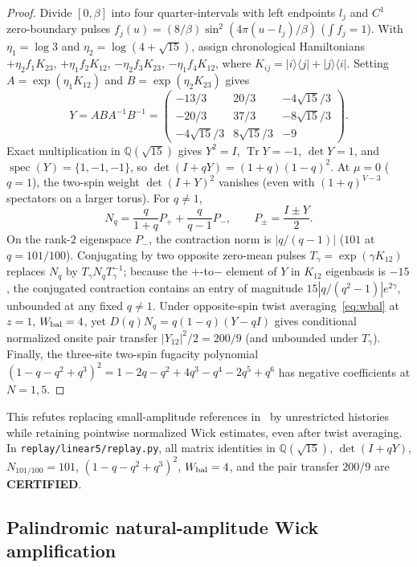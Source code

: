\documentclass[11pt]{article}
\theoremstyle{remark}
\DeclareMathOperator{\Tr}{Tr}
\DeclareMathOperator{\spec}{spec}
\newcommand{\certified}{\textbf{CERTIFIED}}
\begin{document}
\begin{proof}
Divide $[0,\beta]$ into four quarter-intervals with left endpoints $l_j$ and $C^1$ zero-boundary pulses $f_j(u)=(8/\beta)\sin^2(4\pi(u-l_j)/\beta)$ ($\int f_j=1$). With $\eta_1=\log 3$ and $\eta_2=\log(4+\sqrt{15})$, assign chronological Hamiltonians $+\eta_2 f_1 K_{23}$, $+\eta_1 f_2 K_{12}$, $-\eta_2 f_3 K_{23}$, $-\eta_1 f_4 K_{12}$, where $K_{ij}=|i\rangle\langle j|+|j\rangle\langle i|$. Setting $A=\exp(\eta_1 K_{12})$ and $B=\exp(\eta_2 K_{23})$ gives
\begin{equation}\label{eq:monodromy-Y}
 Y=ABA^{-1}B^{-1}=
 \begin{pmatrix}
  -13/3 & 20/3 & -4\sqrt{15}/3\\
  -20/3 & 37/3 & -8\sqrt{15}/3\\
  -4\sqrt{15}/3 & 8\sqrt{15}/3 & -9
 \end{pmatrix}.
\end{equation}
Exact multiplication in $\mathbb Q(\sqrt{15})$ gives $Y^2=I$, $\Tr Y=-1$, $\det Y=1$, and $\spec(Y)=\{1,-1,-1\}$, so $\det(I+qY)=(1+q)(1-q)^2$. At $\mu=0$ ($q=1$), the two-spin weight $\det(I+Y)^2$ vanishes (even with $(1+q)^{V-3}$ spectators on a larger torus). For $q\ne 1$,
\[
 N_q=\frac{q}{1+q}P_+ + \frac{q}{q-1}P_-,\qquad P_\pm=\frac{I\pm Y}{2}.
\]
On the rank-$2$ eigenspace $P_-$, the contraction norm is $|q/(q-1)|$ ($101$ at $q=101/100$). Conjugating by two opposite zero-mean pulses $T_\gamma=\exp(\gamma K_{12})$ replaces $N_q$ by $T_\gamma N_q T_\gamma^{-1}$; because the $+$-to$-$ element of $Y$ in $K_{12}$ eigenbasis is $-15$, the conjugated contraction contains an entry of magnitude $15|q/(q^2-1)|e^{2\gamma}$, unbounded at any fixed $q\ne 1$. Under opposite-spin twist averaging~\eqref{eq:wbal} at $z=1$, $W_{\rm bal}=4$, yet $D(q)N_q=q(1-q)(Y-qI)$ gives conditional normalized onsite pair transfer $|Y_{12}|^2/2=200/9$ (and unbounded under $T_\gamma$). Finally, the three-site two-spin fugacity polynomial $(1-q-q^2+q^3)^2=1-2q-q^2+4q^3-q^4-2q^5+q^6$ has negative coefficients at $N=1,5$.
\end{proof}

This refutes replacing small-amplitude references in~\cite{linear4} by unrestricted histories while retaining pointwise normalized Wick estimates, even after twist averaging. In \texttt{replay/linear5/replay.py}, all matrix identities in $\mathbb Q(\sqrt{15})$, $\det(I+qY)$, $N_{101/100}=101$, $(1-q-q^2+q^3)^2$, $W_{\rm bal}=4$, and the pair transfer $200/9$ are \certified{}.

\subsection{Palindromic natural-amplitude Wick amplification}
\end{document}
